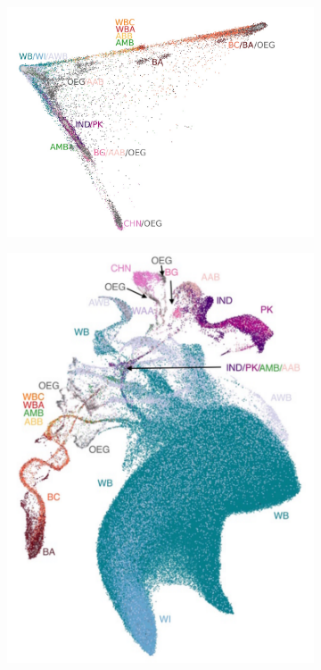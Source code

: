 \documentclass[12pt]{pnas-new}
\begin{document}
\begin{figure}%
\centering
\begin{subfigure}{.5\columnwidth}
\includegraphics[width=\columnwidth]{images/UKBB_PC0_PC1_eth_crop.jpeg}%
\caption{}%
\label{fig:pc_ukbb}%
\end{subfigure}\hfill%
\begin{subfigure}{.5\columnwidth}
\includegraphics[width=\columnwidth]{images/UKBB_UMAP_PC10_NN15_MD05_eth_labels.pdf}%

\end{subfigure}
\end{figure}
\end{document}
